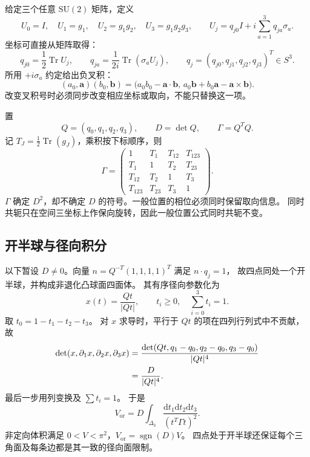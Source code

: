 \documentclass[UTF8,11pt,fontset=none]{ctexart}
\numberwithin{equation}{section}
\theoremstyle{definition}
\DeclareMathOperator{\Tr}{Tr}
\DeclareMathOperator{\sgn}{sgn}
\newcommand{\dd}{\mathrm d}
\newcommand{\SU}{\mathrm{SU}(2)}
\newcommand{\Id}{I}
\newcommand{\Vor}{V_{\mathrm{or}}}
\begin{document}
给定三个任意 $\SU$ 矩阵，定义
\begin{equation}
 U_0=\Id,\quad U_1=g_1,\quad U_2=g_1g_2,\quad U_3=g_1g_2g_3,
 \qquad U_j=q_{j0}\Id+i\sum_{a=1}^3q_{ja}\sigma_a.
 \label{eq:cumulative}
\end{equation}
坐标可直接从矩阵取得：
\[
 q_{j0}=\frac12\Tr U_j,\qquad
 q_{ja}=\frac1{2i}\Tr(\sigma_aU_j),\qquad
 q_j=(q_{j0},q_{j1},q_{j2},q_{j3})^T\in S^3.
\]
所用 $+i\sigma_a$ 约定给出负叉积：
\begin{equation}
 (a_0,\boldsymbol a)(b_0,\boldsymbol b)
 =\big(a_0b_0-\boldsymbol a\cdot\boldsymbol b,\,
 a_0\boldsymbol b+b_0\boldsymbol a-\boldsymbol a\times\boldsymbol b\big).
 \label{eq:quaternion-product}
\end{equation}
改变叉积号时必须同步改变相应坐标或取向，不能只替换这一项。

置
\begin{equation}
 Q=(q_0,q_1,q_2,q_3),\qquad D=\det Q,\qquad \Gamma=Q^TQ.
 \label{eq:QGD}
\end{equation}
记 $T_J=\frac12\Tr(g_J)$，乘积按下标顺序，则
\begin{equation}
 \Gamma=
 \begin{pmatrix}
 1&T_1&T_{12}&T_{123}\\
 T_1&1&T_2&T_{23}\\
 T_{12}&T_2&1&T_3\\
 T_{123}&T_{23}&T_3&1
 \end{pmatrix}.
 \label{eq:trace-gram}
\end{equation}
$\Gamma$ 确定 $D^2$，却不确定 $D$ 的符号。一般位置的相位必须同时保留取向信息。
同时共轭只在空间三坐标上作保向旋转，因此一般位置公式同时共轭不变。

\subsection{开半球与径向积分}

以下暂设 $D\ne0$。向量
$n=Q^{-T}(1,1,1,1)^T$ 满足 $n\cdot q_j=1$，
故四点同处一个开半球，并构成非退化凸球面四面体。
其有序径向参数化为
\begin{equation}
 x(t)=\frac{Qt}{|Qt|},\qquad
 t_i\ge0,\quad \sum_{i=0}^3t_i=1.
 \label{eq:radial-map}
\end{equation}
取 $t_0=1-t_1-t_2-t_3$。
对 $x$ 求导时，平行于 $Qt$ 的项在四列行列式中不贡献，故
\begin{align}
 \det(x,\partial_1x,\partial_2x,\partial_3x)
 &=\frac{\det(Qt,q_1-q_0,q_2-q_0,q_3-q_0)}{|Qt|^4}\notag\\
 &=\frac{D}{|Qt|^4}.
 \label{eq:radial-jacobian}
\end{align}
最后一步用列变换及 $\sum t_i=1$。
于是
\begin{equation}
 \Vor=D\int_{\Delta_3}\frac{\dd t_1\dd t_2\dd t_3}{(t^T\Gamma t)^2}.
 \label{eq:radial-integral}
\end{equation}
非定向体积满足 $0<V<\pi^2$，$\Vor=\sgn(D)V$。
四点处于开半球还保证每个三角面及每条边都是其一致的径向面限制。
\end{document}
